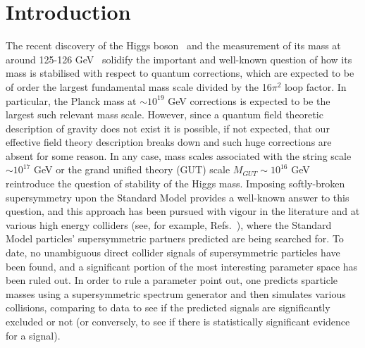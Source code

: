 \documentclass[final,3p,times,pdflatex]{elsarticle}
\begin{document}
\section{Introduction}

The recent discovery of the Higgs boson~\cite{Aad:2012tfa,Chatrchyan:2012ufa}
and the measurement of its mass at around 
125-126 GeV~\cite{ATLAS-CONF-2013-014} solidify the important and well-known
question of how its mass is 
stabilised with respect to quantum corrections, which are expected to be of
order the largest fundamental mass scale divided by the 16$\pi^2$ loop factor.
In particular, the Planck mass at $\sim 10^{19}$ GeV 
corrections is expected to be the largest such relevant mass scale. 
However, since a quantum field theoretic description of gravity does not
exist it is possible, if not expected, that our effective field theory
description breaks down and such huge corrections are absent
for some reason. 
In any case, mass scales associated with the string scale $\sim 10^{17}$ GeV
or the grand unified theory (GUT) scale $M_{GUT}\sim 10^{16}$ GeV reintroduce
the question of stability of 
the Higgs mass.  
Imposing softly-broken supersymmetry upon the Standard Model provides a
well-known answer to this question, and this approach has been pursued
with vigour in the literature and at various high energy colliders (see, for
example, Refs.~\cite{Aad:2013wta,Chatrchyan:2014lfa}), where 
the Standard Model particles' supersymmetric partners predicted are being
searched for. To date, no unambiguous direct collider signals of
supersymmetric particles have been found, and a significant portion of the
most interesting parameter space has been ruled out. 
In order to rule a parameter point out, one predicts sparticle masses using
a supersymmetric spectrum generator and then simulates various collisions,
comparing to data to see if the predicted signals are significantly excluded
or not (or conversely, to see if there is statistically significant evidence
for a signal). 
\end{document}

